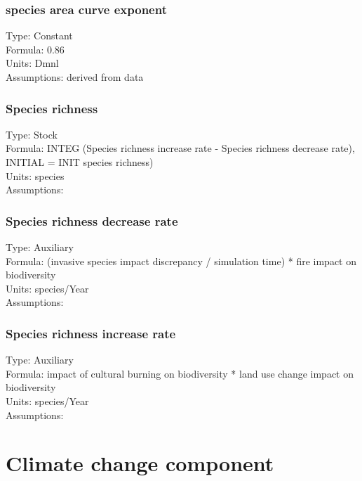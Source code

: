 \documentclass[
  11pt,
]{book}
\begin{document}
\hypertarget{species-area-curve-exponent}{%
\subsection{species area curve exponent}\label{species-area-curve-exponent}}

Type: Constant\\
Formula: 0.86\\
Units: Dmnl\\
Assumptions: derived from data

\hypertarget{species-richness}{%
\subsection{Species richness}\label{species-richness}}

Type: Stock\\
Formula: INTEG (Species richness increase rate - Species richness decrease rate), INITIAL = INIT species richness)\\
Units: species\\
Assumptions:

\hypertarget{species-richness-decrease-rate}{%
\subsection{Species richness decrease rate}\label{species-richness-decrease-rate}}

Type: Auxiliary\\
Formula: (invasive species impact discrepancy / simulation time) * fire impact on biodiversity\\
Units: species/Year\\
Assumptions:

\hypertarget{species-richness-increase-rate}{%
\subsection{Species richness increase rate}\label{species-richness-increase-rate}}

Type: Auxiliary\\
Formula: impact of cultural burning on biodiversity * land use change impact on biodiversity\\
Units: species/Year\\
Assumptions:

\hypertarget{climate-change-component}{%
\chapter{Climate change component}\label{climate-change-component}}
\end{document}
